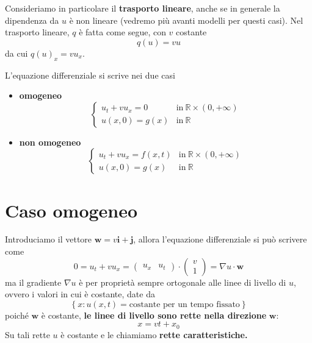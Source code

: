 \documentclass[10pt,a4paper,twoside,openright]{book}
\begin{document}
Consideriamo in particolare il \textbf{trasporto lineare}, anche se in generale la dipendenza da $u$ è non lineare (vedremo più avanti modelli per questi casi). Nel trasporto lineare, $q$ è fatta come segue, con $v$ costante
\begin{equation}
	q(u) =vu
\end{equation}
da cui $q(u)_{x} =vu_{x}$.

L'equazione differenziale si scrive nei due casi
\begin{itemize}
	\item \textbf{omogeneo}
	      \begin{equation*}
	      	\begin{cases}
	      		u_{t} +vu_{x} =\boxed{0} & \text{in} \ \mathbb{R} \times (0,+\infty) \\
	      		u(x,0) =g(x)   & \text{in} \ \mathbb{R}                      
	      	\end{cases}
	      \end{equation*}
	\item \textbf{non omogeneo}
	      \begin{equation*}
	      	\begin{cases}
	      		u_{t} +vu_{x} =\boxed{f(x,t)} & \text{in} \ \mathbb{R} \times (0,+\infty) \\
	      		u(x,0) =g(x)         & \text{in} \ \mathbb{R}                      
	      	\end{cases}
	      \end{equation*}
\end{itemize}
\section{Caso omogeneo}

Introduciamo il vettore $\mathbf{w} =v\mathbf{i} +\mathbf{j}$, allora l'equazione differenziale si può scrivere come
\begin{equation*}
	0=u_{t} +vu_{x} =
	\begin{pmatrix}
	u_{x} & u_{t}
	\end{pmatrix} \cdotp \begin{pmatrix}
	v\\
	1
	\end{pmatrix} =\nabla u\cdotp \mathbf{w}
\end{equation*}
ma il gradiente $\nabla u$ è per proprietà sempre ortogonale alle linee di livello di $u$, ovvero i valori in cui è costante, date da
\begin{equation*}
	\left\{x:u(x,t) =\text{costante per un tempo fissato}\right\}
\end{equation*}
poiché $\mathbf{w}$ è costante, \textbf{le linee di livello sono rette nella direzione} $\mathbf{w}$:
\begin{equation}
	x=vt+x_{0}
\end{equation}
Su tali rette $u$ è costante e le chiamiamo \textbf{rette caratteristiche.}
\end{document}

